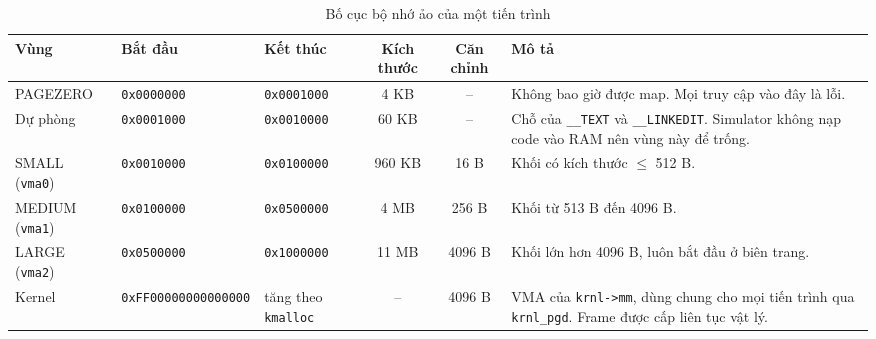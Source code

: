 \documentclass[12pt,a4paper]{article}
\begin{document}
	\begin{table}[htbp]
	\centering
	\scriptsize
	\setlength{\tabcolsep}{3pt}
	\renewcommand{\arraystretch}{1.15}
	\begin{tabularx}{\linewidth}{| >{\raggedright\arraybackslash}p{1.8cm} | >{\raggedright\arraybackslash}p{2.75cm} | >{\raggedright\arraybackslash}p{1.6cm} | c | c | >{\raggedright\arraybackslash}X |}
	\hline
	\textbf{Vùng} & \textbf{Bắt đầu} & \textbf{Kết thúc} & \textbf{Kích thước} & \textbf{Căn chỉnh} & \textbf{Mô tả} \\
	\hline
	PAGEZERO & \texttt{0x0000000} & \texttt{0x0001000} & 4 KB & -- & Không bao giờ được map. Mọi truy cập vào đây là lỗi. \\
	\hline
	Dự phòng & \texttt{0x0001000} & \texttt{0x0010000} & 60 KB & -- & Chỗ của \texttt{\_\_TEXT} và \texttt{\_\_LINKEDIT}. Simulator không nạp code vào RAM nên vùng này để trống. \\
	\hline
	SMALL (\texttt{vma0}) & \texttt{0x0010000} & \texttt{0x0100000} & 960 KB & 16 B & Khối có kích thước $\le$ 512 B. \\
	\hline
	MEDIUM (\texttt{vma1}) & \texttt{0x0100000} & \texttt{0x0500000} & 4 MB & 256 B & Khối từ 513 B đến 4096 B. \\
	\hline
	LARGE (\texttt{vma2}) & \texttt{0x0500000} & \texttt{0x1000000} & 11 MB & 4096 B & Khối lớn hơn 4096 B, luôn bắt đầu ở biên trang. \\
	\hline
	Kernel & \texttt{0xFF00000000000000} & tăng theo \texttt{kmalloc} & -- & 4096 B & VMA của \texttt{krnl->mm}, dùng chung cho mọi tiến trình qua \texttt{krnl\_pgd}. Frame được cấp liên tục vật lý. \\
	\hline
	\end{tabularx}
	\caption{Bố cục bộ nhớ ảo của một tiến trình}
	\label{tab:memory_layout}
	\end{table}
\end{document}
